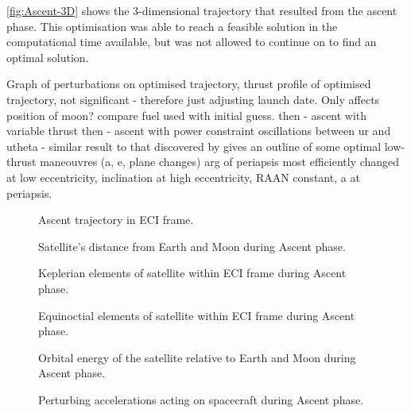 \autoref{fig:Ascent-3D} shows the 3-dimensional trajectory that resulted from the ascent phase. This optimisation was able to reach a feasible solution in the computational time available, but was not allowed to continue on to find an optimal solution. 

Graph of perturbations on optimised trajectory, thrust profile of optimised trajectory, not significant - therefore just adjusting launch date. Only affects position of moon?
compare fuel used with initial guess.
then - ascent with variable thrust
then - ascent with power constraint
oscillations between ur and utheta - similar result to that discovered by \textcite{Betts2003}
\textcite{Edelbaum1964} gives an outline of some optimal low-thrust maneouvres (a, e, plane changes)
arg of periapsis most efficiently changed at low eccentricity, inclination at high eccentricity, RAAN constant, a at periapsis.

\begin{figure}
\centering
\def\svgwidth{\figurewidth}

\caption{Ascent trajectory in ECI frame.}
\label{fig:Ascent-3D}
\end{figure}

\begin{figure}
\centering
\def\svgwidth{\figurewidth}

\caption{Satellite's distance from Earth and Moon during Ascent phase.}
\label{fig:Ascent-dist}
\end{figure}

\begin{figure}
\centering
\def\svgwidth{\figurewidth}

\caption{Keplerian elements of satellite within ECI frame during Ascent phase.}
\label{fig:Ascent-kep}
\end{figure}

\begin{figure}
\centering
\def\svgwidth{\figurewidth}

\caption{Equinoctial elements of satellite within ECI frame during Ascent phase.}
\label{fig:Ascent-mee}
\end{figure}

\begin{figure}
\centering
\def\svgwidth{\figurewidth}

\caption{Orbital energy of the satellite relative to Earth and Moon during Ascent phase.}
\label{fig:Ascent-orbeng}
\end{figure}

\begin{figure}
\centering
\def\svgwidth{\figurewidth}

\caption{Perturbing accelerations acting on spacecraft during Ascent phase.}
\label{fig:Ascent-pert}
\end{figure}

